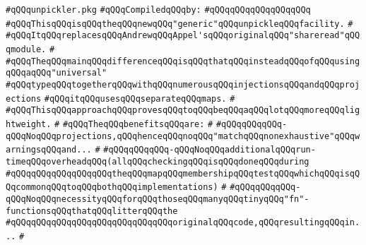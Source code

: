 \label{src/lib/compiler/src/library/unpickler.pkg}
\verb|#qQQqunpickler.pkg|\newline
\newline
\verb|#qQQqCompiledqQQqby:|\newline
\verb|#qQQqqQQqqQQqqQQqqQQq|\newline
\newline
\newline
\newline
\verb|#qQQqThisqQQqisqQQqtheqQQqnewqQQq"generic"qQQqunpickleqQQqfacility.|\newline
\verb|#|\newline
\verb|#qQQqItqQQqreplacesqQQqAndrewqQQqAppel'sqQQqoriginalqQQq"shareread"qQQqmodule.|\newline
\verb|#|\newline
\verb|#qQQqTheqQQqmainqQQqdifferenceqQQqisqQQqthatqQQqinsteadqQQqofqQQqusingqQQqaqQQq"universal"|\newline
\verb|#qQQqtypeqQQqtogetherqQQqwithqQQqnumerousqQQqinjectionsqQQqandqQQqprojections|\newline
\verb|#qQQqitqQQqusesqQQqseparateqQQqmaps.|\newline
\verb|#|\newline
\verb|#qQQqThisqQQqapproachqQQqprovesqQQqtoqQQqbeqQQqaqQQqlotqQQqmoreqQQqlightweight.|\newline
\verb|#|\newline
\verb|#qQQqTheqQQqbenefitsqQQqare:|\newline
\verb|#|\newline
\verb|#qQQqqQQqqQQq-qQQqNoqQQqprojections,qQQqhenceqQQqnoqQQq"matchqQQqnonexhaustive"qQQqwarningsqQQqand...|\newline
\verb|#|\newline
\verb|#qQQqqQQqqQQq-qQQqNoqQQqadditionalqQQqrun-timeqQQqoverheadqQQq(allqQQqcheckingqQQqisqQQqdoneqQQqduring|\newline
\verb|#qQQqqQQqqQQqqQQqqQQqtheqQQqmapqQQqmembershipqQQqtestqQQqwhichqQQqisqQQqcommonqQQqtoqQQqbothqQQqimplementations)|\newline
\verb|#|\newline
\verb|#qQQqqQQqqQQq-qQQqNoqQQqnecessityqQQqforqQQqthoseqQQqmanyqQQqtinyqQQq"fn"-functionsqQQqthatqQQqlitterqQQqthe|\newline
\verb|#qQQqqQQqqQQqqQQqqQQqqQQqqQQqqQQqoriginalqQQqcode,qQQqresultingqQQqin...|\newline
\verb|#|\newline
